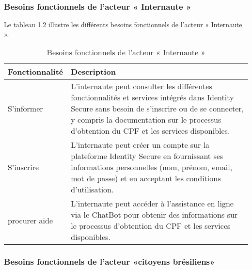 \subsubsection{Besoins fonctionnels de l'acteur « Internaute »}

Le tableau 1.2 illustre les différents besoins fonctionnels de l'acteur « Internaute ».

\begin{table}[H]
\centering
\caption{ \centering Besoins fonctionnels de l'acteur « Internaute »}
\label{tab:backlog:ch1:1}
\begin{tabular}
{| >{\centering\arraybackslash}p{4.2cm} | >{\centering\arraybackslash}p{12.5cm} |}
\rowcolor{gray!30} %
\hline \textbf{Fonctionnalité} & \textbf{Description}\\
\hline  S'informer &  L'internaute peut consulter les différentes fonctionnalités et services intégrés dans Identity Secure sans besoin de s'inscrire ou de se connecter, y compris la documentation sur le processus d'obtention du CPF et les services disponibles. \\
\hline S'inscrire &  L'internaute peut créer un compte sur la plateforme Identity Secure en fournissant ses informations personnelles (nom, prénom, email, mot de passe) et en acceptant les conditions d'utilisation. \\
\hline procurer aide &  L'internaute peut accéder à l'assistance en ligne via le ChatBot pour obtenir des informations sur le processus d'obtention du CPF et les services disponibles. \\
\hline
\end{tabular}
\end{table}
\subsubsection{Besoins fonctionnels de l'acteur «citoyens brésiliens»}

